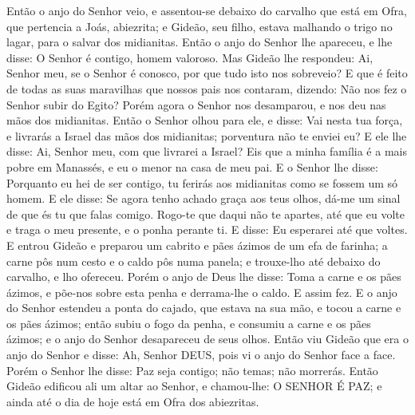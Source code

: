 Então o anjo do Senhor veio, e assentou-se debaixo do carvalho
que está em Ofra, que pertencia a Joás, abiezrita; e Gideão, seu
filho, estava malhando o trigo no lagar, para o salvar dos
midianitas. Então o anjo do Senhor lhe apareceu, e lhe disse:
O Senhor é contigo, homem valoroso. Mas Gideão lhe respondeu:
Ai, Senhor meu, se o Senhor é conosco, por que tudo isto nos
sobreveio? E que é feito de todas as suas maravilhas que nossos pais
nos contaram, dizendo: Não nos fez o Senhor subir do Egito? Porém
agora o Senhor nos desamparou, e nos deu nas mãos dos midianitas.
Então o Senhor olhou para ele, e disse: Vai nesta tua força,
e livrarás a Israel das mãos dos midianitas; porventura não te
enviei eu? E ele lhe disse: Ai, Senhor meu, com que livrarei
a Israel? Eis que a minha família é a mais pobre em Manassés, e eu o
menor na casa de meu pai. E o Senhor lhe disse: Porquanto eu
hei de ser contigo, tu ferirás aos midianitas como se fossem um só
homem. E ele disse: Se agora tenho achado graça aos teus
olhos, dá-me um sinal de que és tu que falas comigo. Rogo-te
que daqui não te apartes, até que eu volte e traga o meu presente, e
o ponha perante ti. E disse: Eu esperarei até que voltes. E
entrou Gideão e preparou um cabrito e pães ázimos de um efa de
farinha; a carne pôs num cesto e o caldo pôs numa panela; e
trouxe-lho até debaixo do carvalho, e lho ofereceu. Porém o
anjo de Deus lhe disse: Toma a carne e os pães ázimos, e põe-nos
sobre esta penha e derrama-lhe o caldo. E assim fez. E o anjo
do Senhor estendeu a ponta do cajado, que estava na sua mão, e tocou
a carne e os pães ázimos; então subiu o fogo da penha, e consumiu a
carne e os pães ázimos; e o anjo do Senhor desapareceu de seus
olhos. Então viu Gideão que era o anjo do Senhor e disse: Ah,
Senhor DEUS, pois vi o anjo do Senhor face a face. Porém o
Senhor lhe disse: Paz seja contigo; não temas; não morrerás.
Então Gideão edificou ali um altar ao Senhor, e chamou-lhe: O
SENHOR É PAZ; e ainda até o dia de hoje está em Ofra dos abiezritas.

